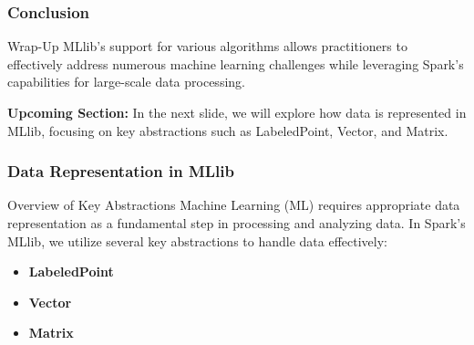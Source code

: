 \documentclass[aspectratio=169]{beamer}
\begin{document}
\begin{frame}[fragile]
    \frametitle{Conclusion}

    \begin{block}{Wrap-Up}
        MLlib's support for various algorithms allows practitioners to effectively address numerous machine learning challenges while leveraging Spark's capabilities for large-scale data processing.
    \end{block}
    
    \textbf{Upcoming Section:} In the next slide, we will explore how data is represented in MLlib, focusing on key abstractions such as LabeledPoint, Vector, and Matrix.
\end{frame}

\begin{frame}[fragile]
    \frametitle{Data Representation in MLlib}
    \begin{block}{Overview of Key Abstractions}
        Machine Learning (ML) requires appropriate data representation as a fundamental step in processing and analyzing data. In Spark's MLlib, we utilize several key abstractions to handle data effectively: 
        \begin{itemize}
            \item \textbf{LabeledPoint}
            \item \textbf{Vector}
            \item \textbf{Matrix}
        \end{itemize}
    \end{block}
\end{frame}
\end{document}

